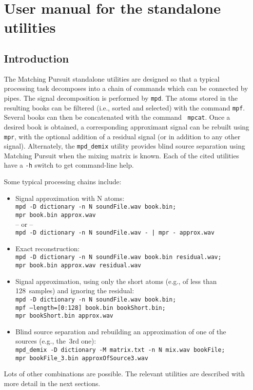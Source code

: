 \documentclass[11pt,a4paper]{article}
\begin{document}
\section{User manual for the standalone utilities \label{man}}

\subsection{Introduction}

The Matching Pursuit standalone utilities are designed so that a typical
processing task decomposes into a chain of commands which can be connected by
pipes. The signal decomposition is performed by {\tt mpd}. The atoms stored in
the resulting books can be filtered (i.e., sorted and selected) with the
command {\tt mpf}. Several books can then be concatenated with the command {\tt
  mpcat}. Once a desired book is obtained, a corresponding approximant signal
can be rebuilt using {\tt mpr}, with the optional addition of a residual signal
(or in addition to any other signal). Alternately, the {\tt mpd\_demix} utility
provides blind source separation using Matching Pursuit when the mixing matrix
is known. Each of the cited utilities have a {\tt -h} switch to get
command-line help.

\bigskip

\noindent Some typical processing chains include:
\begin{itemize}
\item Signal approximation with N atoms: \\
      \mbox{\tt mpd -D dictionary -n N soundFile.wav book.bin;} \\
      \mbox{\tt mpr book.bin approx.wav} \\
      -- or -- \\
      \mbox{\tt mpd -D dictionary -n N soundFile.wav - | mpr - approx.wav}
\item Exact reconstruction: \\
      \mbox{\tt mpd -D dictionary -n N soundFile.wav book.bin residual.wav;} \\
      \mbox{\tt mpr book.bin approx.wav residual.wav}
\item Signal approximation, using only the short atoms (e.g., of less than
128~samples) \linebreak and ignoring the residual: \\
      \mbox{\tt mpd -D dictionary -n N soundFile.wav book.bin;} \\
      \mbox{\tt mpf --length=[0:128] book.bin bookShort.bin;} \\
      \mbox{\tt mpr bookShort.bin approx.wav}
\item Blind source separation and rebuilding an approximation of one of the
  sources (e.g., the~3rd one): \\
      \mbox{\tt mpd\_demix -D dictionary -M matrix.txt -n N mix.wav bookFile;} \\
      \mbox{\tt mpr bookFile\_3.bin approxOfSource3.wav}
\end{itemize}
Lots of other combinations are possible. The relevant utilities are described
with more detail in the next sections.
\end{document}
